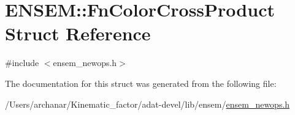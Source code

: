 \hypertarget{structENSEM_1_1FnColorCrossProduct}{}\section{E\+N\+S\+EM\+:\+:Fn\+Color\+Cross\+Product Struct Reference}
\label{structENSEM_1_1FnColorCrossProduct}


{\ttfamily \#include $<$ensem\+\_\+newops.\+h$>$}



The documentation for this struct was generated from the following file\+:\begin{DoxyCompactItemize}
\item 
/\+Users/archanar/\+Kinematic\+\_\+factor/adat-\/devel/lib/ensem/\mbox{\hyperlink{adat-devel_2lib_2ensem_2ensem__newops_8h}{ensem\+\_\+newops.\+h}}\end{DoxyCompactItemize}
